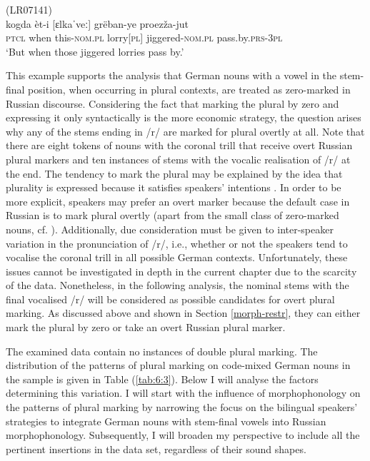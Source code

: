 \ea
\label{ex:6:17}
(LR07141)\\
 {kogda} {èt-i} [ɛlkaˈveː] {grëban-ye} {proezža-jut}\\
	\textsc{ptcl} when this-\textsc{nom.pl} lorry[\textsc{pl}] jiggered-\textsc{nom.pl} pass.by.\textsc{prs-3pl}\\
\glt `But when those jiggered lorries pass by.'
\z

\noindent This example supports the analysis that German nouns with a vowel in the stem-final position, when occurring in plural contexts, are treated as zero-marked in Russian discourse. Considering the fact that marking the plural by zero and expressing it only syntactically is the more economic strategy, the question arises why any of the stems ending in /r/ are marked for plural overtly at all. Note that there are eight tokens of nouns with the coronal trill that receive overt Russian plural markers and ten instances of stems with the vocalic realisation of /r/ at the end. The tendency to mark the plural may be explained by the idea that plurality is expressed because it satisfies speakers' intentions \citep[150]{myers-scotton-contact-2002}. In order to be more explicit, speakers may prefer an overt marker because the default case in Russian is to mark plural overtly (apart from the small class of zero-marked nouns, cf. \citealt[218]{zaliznjak02}). Additionally, due consideration must be given to inter-speaker variation in the pronunciation of /r/, i.e., whether or not the speakers tend to vocalise the coronal trill in all possible German contexts. Unfortunately, these issues cannot be investigated in depth in the current chapter due to the scarcity of the data. Nonetheless, in the following analysis, the nominal stems with the final vocalised /r/ will be considered as possible candidates for overt plural marking. As discussed above and shown in Section \ref{morph-restr}, they can either mark the plural by zero or take an overt Russian plural marker.

The examined data contain no instances of double plural marking. The distribution of the patterns of plural marking on code-mixed German nouns in the sample is given in Table (\ref{tab:6:3}). Below I will analyse the factors determining this variation. I will start with the influence of morphophonology on the patterns of plural marking by narrowing the focus on the bilingual speakers’ strategies to integrate German nouns with stem-final vowels into Russian morphophonology. Subsequently, I will broaden my perspective to include all the pertinent insertions in the data set, regardless of their sound shapes.


